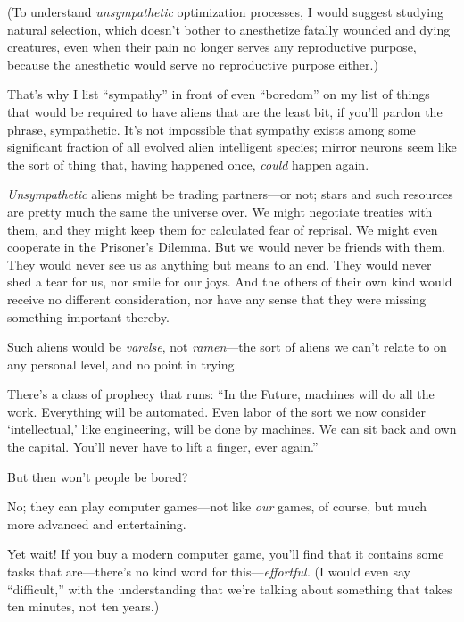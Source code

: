 {
 (To understand \textit{unsympathetic} optimization processes, I
would suggest studying natural selection, which doesn't
bother to anesthetize fatally wounded and dying creatures, even when
their pain no longer serves any reproductive purpose, because the
anesthetic would serve no reproductive purpose either.)}

{
 That's why I list
``sympathy'' in front of even
``boredom'' on my list of things
that would be required to have aliens that are the least bit, if
you'll pardon the phrase, sympathetic.
It's not impossible that sympathy exists among some
significant fraction of all evolved alien intelligent species; mirror
neurons seem like the sort of thing that, having happened once,
\textit{could} happen again.}

{
 \textit{Unsympathetic} aliens might be trading partners---or not;
stars and such resources are pretty much the same the universe over. We
might negotiate treaties with them, and they might keep them for
calculated fear of reprisal. We might even cooperate in the
Prisoner's Dilemma. But we would never be friends with
them. They would never see us as anything but means to an end. They
would never shed a tear for us, nor smile for our joys. And the others
of their own kind would receive no different consideration, nor have
any sense that they were missing something important thereby.}

{
 Such aliens would be \textit{varelse}, not \textit{ramen}{}---the
sort of aliens we can't relate to on any personal
level, and no point in trying.}

\myendsectiontext


{
 There's a class of prophecy that runs:
``In the Future, machines will do all the work.
Everything will be automated. Even labor of the sort we now consider
`intellectual,' like engineering, will
be done by machines. We can sit back and own the capital.
You'll never have to lift a finger, ever
again.'' }

{
 But then won't people be bored?}

{
 No; they can play computer games---not like \textit{our} games, of
course, but much more advanced and entertaining.}

{
 Yet wait! If you buy a modern computer game,
you'll find that it contains some tasks that
are---there's no kind word for
this---\textit{effortful.} (I would even say
``difficult,'' with the
understanding that we're talking about something that
takes ten minutes, not ten years.)}

